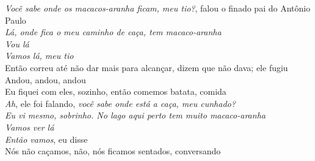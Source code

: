\begin{linenumbers}\begingroup\raggedright
 
\noindent   \emph{Você sabe onde os macacos-aranha ficam, meu tio?}, falou o finado pai do Antônio Paulo\\
  \emph{Lá, onde fica o meu caminho de caça, tem macaco-aranha}\\
  \emph{Vou lá}\\
  \emph{Vamos lá, meu tio}\\
  Então correu até não dar mais para alcançar, dizem que não dava; ele fugiu\\
  Andou, andou, andou\\
  Eu fiquei com eles, sozinho, então comemos batata, comida\\
  \emph{Ah}, ele foi falando, \emph{você sabe onde está a caça, meu cunhado?}\\
  \emph{Eu vi mesmo, sobrinho. No lago aqui perto tem muito macaco-aranha}\\
  \emph{Vamos ver lá}\\
  \emph{Então vamos}, eu disse\\
  Nós não caçamos, não, nós ficamos sentados, conversando
 
\end{linenumbers}\endgroup

\bigskip

